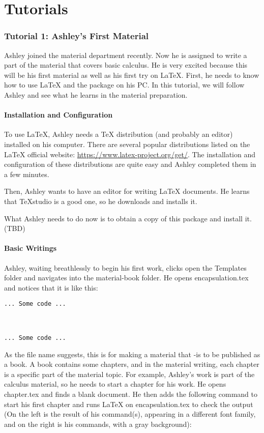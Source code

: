 \part{Tutorials}
\section{Tutorial 1: Ashley's First Material}
Ashley joined the material department recently. Now he is assigned to write a part of the material that covers basic calculus. He is very excited because this will be his first material as well as his first try on \LaTeX. First, he needs to know how to use \LaTeX{} and the package on his PC. In this tutorial, we will follow Ashley and see what he learns in the material preparation.

\subsection{Installation and Configuration}
To use \LaTeX{}, Ashley needs a \TeX{} distribution (and probably an editor) installed on his computer. There are several popular distributions listed on the \LaTeX{} official website: \url{https://www.latex-project.org/get/}. The installation and configuration of these distributions are quite easy and Ashley completed them in a few minutes.

Then, Ashley wants to have an editor for writing \LaTeX{} documents. He learns that \TeX studio is a good one, so he downloads and installs it.

What Ashley needs to do now is to obtain a copy of this package and install it. (TBD)

\subsection{Basic Writings}
Ashley, waiting breathlessly to begin his first work, clicks open the Templates folder and navigates into the material-book folder. He opens encapsulation.tex and notices that it is like this:
\begin{lstlisting}
... Some code ...



... Some code ...
\end{lstlisting}

As the file name suggests, this is for making a material that -is to be published as a book. A book contains some chapters, and in the material writing, each chapter is a specific part of the material topic. For example, Ashley's work is part of the calculus material, so he needs to start a chapter for his work. He opens chapter.tex and finds a blank document. He then adds the following command to start his first chapter and runs \LaTeX{} on encapsulation.tex to check the output (On the left is the result of his command(s), appearing in a different font family, and on the right is his commands, with a gray background):

